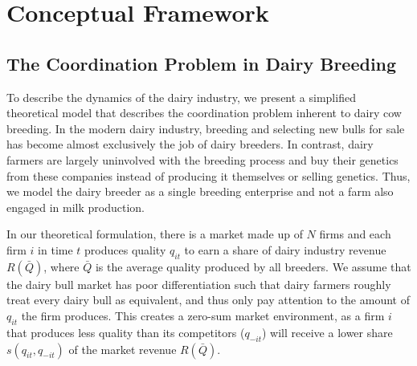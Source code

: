 \documentclass[12pt,letterpaper]{article}
\begin{document}

\section{Conceptual Framework\label{sec:concept_frame}}

\subsection{The Coordination Problem in Dairy Breeding\label{subsec:coord_problem}}
To describe the dynamics of the dairy industry, we present a simplified theoretical model that describes the coordination problem inherent to dairy cow breeding.
In the modern dairy industry, breeding and selecting new bulls for sale has become almost exclusively the job of dairy breeders.
In contrast, dairy farmers are largely uninvolved with the breeding process and buy their genetics from these companies instead of producing it themselves or selling genetics.
Thus, we model the dairy breeder as a single breeding enterprise and not a farm also engaged in milk production.

In our theoretical formulation, there is a market made up of $N$ firms and each firm $i$ in time $t$ produces quality $q_{it}$ to earn a share of dairy industry revenue $R(\bar{Q})$, where $\bar{Q}$ is the average quality produced by all breeders.
We assume that the dairy bull market has poor differentiation such that dairy farmers roughly treat every dairy bull as equivalent, and thus only pay attention to the amount of $q_{it}$ the firm produces.
This creates a zero-sum market environment, as a firm $i$ that produces less quality than its competitors ($q_{-it}$) will receive a lower share $s(q_{it},q_{-it})$ of the market revenue $R(\bar{Q})$.
\end{document}
